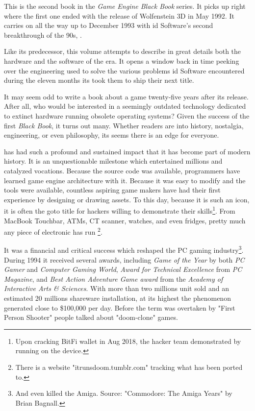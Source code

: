 This is the second book in the \textit{Game Engine Black Book} series. It picks up right where the first one ended with the release of Wolfenstein 3D in May 1992. It carries on all the way up to December 1993 with id Software's second breakthrough of the 90s, \doom{}.\\ %
\par
 Like its predecessor, this volume attempts to describe in great details both the hardware and the software of the era. It opens a window back in time peeking over the engineering used to solve the various problems id Software encountered during the eleven months its took them to ship their next title.\\%
\par
It may seem odd to write a book about a game twenty-five years after its release. After all, who would be interested in a seemingly outdated technology dedicated to extinct hardware running obsolete operating systems? Given the success of the first \textit{Black Book}, it turns out many. Whether readers are into history, nostalgia, engineering, or even philosophy, its seems there is an edge for everyone.\\ 

\par
\doom{} has had such a profound and sustained impact that it has become part of modern history. It is an unquestionable milestone which entertained millions and catalyzed vocations. Because the source code was available, programmers have learned game engine architecture with it. Because it was easy to modify and the tools were available, countless aspiring game makers have had their first experience by designing or drawing assets. To this day, because it is such an icon, it is often the goto title for hackers willing to demonstrate their skills\footnote{Upon cracking BitFi wallet in Aug 2018, the hacker team demonstrated by running \doom{} on the device.}. From MacBook Touchbar, ATMs, CT scanner, watches, and even fridges, pretty much any piece of electronic has run \doom{} \footnote{There is a website "itrunsdoom{}.tumblr.com" tracking what \doom{} has been ported to.}.\\
\par

It was a financial and critical success which reshaped the PC gaming industry\footnote{And even killed the Amiga. Source: "Commodore: The Amiga Years" by Brian Bagnall.}. During 1994 it received several awards, including \textit{Game of the Year} by both \textit{PC Gamer} and \textit{Computer Gaming World}, \textit{Award for Technical Excellence} from \textit{PC Magazine}, and \textit{Best Action Adventure Game award} from the \textit{Academy of Interactive Arts \& Sciences}. With more than two millions unit sold and an estimated 20 millions shareware installation, at its highest the phenomenon generated close to \$100,000 per day. Before the term was overtaken by "First Person Shooter" people talked about "doom{}-clone" games.\\
\par

